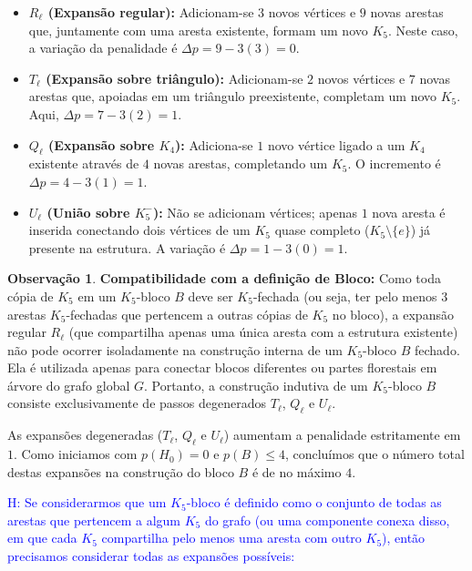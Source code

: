 \documentclass[reqno, 12pt]{amsart}
\numberwithin{equation}{section}
\theoremstyle{plain}
\theoremstyle{definition}
\newtheorem{remark}[theorem]{Observação}
\newcommand{\hugo}[1]{\textcolor{blue}{H: #1}}
\begin{document}
\begin{itemize}
    \item \textbf{$R_\ell$ (Expansão regular):} Adicionam-se $3$ novos vértices e $9$ novas arestas que, juntamente com uma aresta existente, formam um novo $K_5$. Neste caso, a variação da penalidade é $\Delta p = 9 - 3(3) = 0$.
    \item \textbf{$T_\ell$ (Expansão sobre triângulo):} Adicionam-se $2$ novos vértices e $7$ novas arestas que, apoiadas em um triângulo preexistente, completam um novo $K_5$. Aqui, $\Delta p = 7 - 3(2) = 1$.
    \item \textbf{$Q_\ell$ (Expansão sobre $K_4$):} Adiciona-se $1$ novo vértice ligado a um $K_4$ existente através de $4$ novas arestas, completando um $K_5$. O incremento é $\Delta p = 4 - 3(1) = 1$.
    \item \textbf{$U_\ell$ (União sobre $K_5^-$):} Não se adicionam vértices; apenas $1$ nova aresta é inserida conectando dois vértices de um $K_5$ quase completo ($K_5 \setminus \{e\}$) já presente na estrutura. A variação é $\Delta p = 1 - 3(0) = 1$.
\end{itemize}

\begin{remark}
    \textbf{Compatibilidade com a definição de Bloco:} Como toda cópia de $K_5$ em um $K_5$-bloco $B$ deve ser $K_5$-fechada (ou seja, ter pelo menos $3$ arestas $K_5$-fechadas que pertencem a outras cópias de $K_5$ no bloco), a expansão regular $R_\ell$ (que compartilha apenas uma única aresta com a estrutura existente) não pode ocorrer isoladamente na construção interna de um $K_5$-bloco $B$ fechado. Ela é utilizada apenas para conectar blocos diferentes ou partes florestais em árvore do grafo global $G$. Portanto, a construção indutiva de um $K_5$-bloco $B$ consiste exclusivamente de passos degenerados $T_\ell$, $Q_\ell$ e $U_\ell$.
\end{remark}

As expansões degeneradas ($T_\ell$, $Q_\ell$ e $U_\ell$) aumentam a penalidade estritamente em $1$. Como iniciamos com $p(H_0) = 0$ e $p(B) \le 4$, concluímos que o número total destas expansões na construção do bloco $B$ é de no máximo $4$.

\hugo{Se considerarmos que um $K_5$-bloco é definido como o conjunto de todas as arestas que pertencem a algum $K_5$ do grafo (ou uma componente conexa disso, em que cada $K_5$ compartilha pelo menos uma aresta com outro $K_5$), então precisamos considerar todas as expansões possíveis:}
\end{document}
